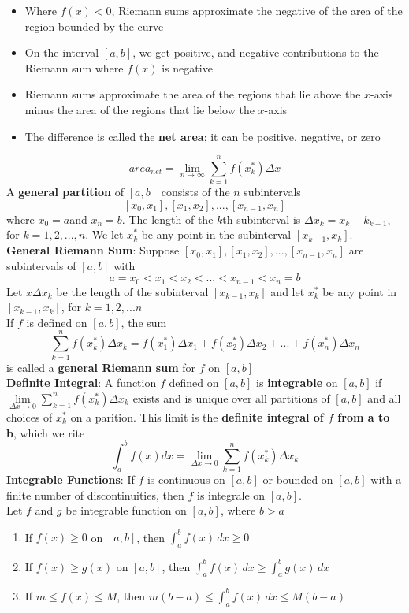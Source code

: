 \documentclass{article}
\begin{document}
\begin{itemize}
    \begin{itemize}
        \item Where $f(x) < 0$, Riemann sums approximate the negative of the area of the region bounded by the curve
        \item On the interval $[a,b]$, we get positive, and negative contributions to the Riemann sum where $f(x)$ is negative
        \item Riemann sums approximate the area of the regions that lie above the $x$-axis minus the area of the regions that lie below the $x$-axis
        \item The difference is called the \textbf{net area}; it can be positive, negative, or zero
    \end{itemize}
    $$area_{net} = \lim_{n \to \infty}{\sum_{k = 1}^{n}{f(x_k^*)\Delta{x}}}$$
    A \textbf{general partition} of $[a,b]$ consists of the $n$ subintervals
    $$[x_0,x_1],[x_1,x_2],...,[x_{n - 1}, x_n]$$
    where $x_0 = a$and $x_n = b$. The length of the $k$th subinterval is $\Delta{x_k} = x_k - k_{k-1}$, for $k = 1,2,...,n$. We let $x_k^*$ be any point in the subinterval $[x_{k - 1}, x_k]$. \\
    \textbf{General Riemann Sum}: Suppose $[x_0,x_1],[x_1, x_2],...,[x_{n - 1}, x_n]$ are subintervals of $[a,b]$ with
    $$a = x_0 < x_1 < x_2 < ... < x_{n - 1} < x_n = b$$
    Let $x\Delta{x_k}$ be the length of the subinterval $[x_{k - 1}, x_k]$ and let $x_k^*$ be any point in $[x_{k - 1}, x_k]$, for $k = 1,2,...n$ \\
    If $f$ is defined on $[a,b]$, the sum
    $$\sum_{k = 1}^{n}{f(x_k^*)\Delta{x_k}} = f(x_1^*)\Delta{x_1} + f(x_2^*)\Delta{x_2} + ... + f(x_n^*)\Delta{x_n}$$
    is called a \textbf{general Riemann sum} for $f$ on $[a,b]$ \\
    \textbf{Definite Integral}: A function $f$ defined on $[a,b]$ is \textbf{integrable} on $[a,b]$ if $\lim\limits_{\Delta{x} \to 0}{\sum\limits_{k = 1}^{n}{f(x_k^*)\Delta{x_k}}}$ exists and is unique over all partitions of $[a,b]$ and all choices of $x_k^*$ on a parition. This limit is the \textbf{definite integral of $f$ from a to b}, which we rite
    $$\int_a^b{f(x)dx} = \lim_{\Delta{x} \to 0}{\sum_{k = 1}^{n}{f(x_k^*)\Delta{x_k}}}$$
    \textbf{Integrable Functions}: If $f$ is continuous on $[a,b]$ or bounded on $[a,b]$ with a finite number of discontinuities, then $f$ is integrale on $[a,b]$. \\
    Let $f$ and $g$ be integrable function on $[a,b]$, where $b > a$
    \begin{enumerate}
        \item If $f(x) \geq 0$ on $[a,b]$, then $\int_a^b{f(x)\,dx} \geq 0$
        \item If $f(x) \geq g(x)$ on $[a,b]$, then $\int_a^b{f(x)\,dx} \geq \int_a^b{g(x)\,dx}$
        \item If $m \leq f(x) \leq M$, then $m(b - a) \leq \int_a^b{f(x)\,dx} \leq M(b - a)$
    \end{enumerate}
\end{itemize}
\end{document}
